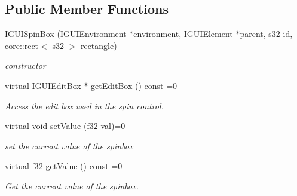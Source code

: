 \subsection*{Public Member Functions}
\begin{DoxyCompactItemize}
\item 
\mbox{\label{classirr_1_1gui_1_1IGUISpinBox_a9e9c785f73b8fadbaff330f1cbb61adf}} 
\hyperlink{classirr_1_1gui_1_1IGUISpinBox_a9e9c785f73b8fadbaff330f1cbb61adf}{I\+G\+U\+I\+Spin\+Box} (\hyperlink{classirr_1_1gui_1_1IGUIEnvironment}{I\+G\+U\+I\+Environment} $\ast$environment, \hyperlink{classirr_1_1gui_1_1IGUIElement}{I\+G\+U\+I\+Element} $\ast$parent, \hyperlink{namespaceirr_ac66849b7a6ed16e30ebede579f9b47c6}{s32} id, \hyperlink{classirr_1_1core_1_1rect}{core\+::rect}$<$ \hyperlink{namespaceirr_ac66849b7a6ed16e30ebede579f9b47c6}{s32} $>$ rectangle)
\begin{DoxyCompactList}\small\item\em constructor \end{DoxyCompactList}\item 
\mbox{\label{classirr_1_1gui_1_1IGUISpinBox_a04bd863724a7b37b97e7f9368fda77ef}} 
virtual \hyperlink{classirr_1_1gui_1_1IGUIEditBox}{I\+G\+U\+I\+Edit\+Box} $\ast$ \hyperlink{classirr_1_1gui_1_1IGUISpinBox_a04bd863724a7b37b97e7f9368fda77ef}{get\+Edit\+Box} () const =0
\begin{DoxyCompactList}\small\item\em Access the edit box used in the spin control. \end{DoxyCompactList}\item 
virtual void \hyperlink{classirr_1_1gui_1_1IGUISpinBox_a28e388e3767d4257f712d899c744bc20}{set\+Value} (\hyperlink{namespaceirr_a0277be98d67dc26ff93b1a6a1d086b07}{f32} val)=0
\begin{DoxyCompactList}\small\item\em set the current value of the spinbox \end{DoxyCompactList}\item 
\mbox{\label{classirr_1_1gui_1_1IGUISpinBox_acfb0ebe7ab30b58e9d34b7925e785bb8}} 
virtual \hyperlink{namespaceirr_a0277be98d67dc26ff93b1a6a1d086b07}{f32} \hyperlink{classirr_1_1gui_1_1IGUISpinBox_acfb0ebe7ab30b58e9d34b7925e785bb8}{get\+Value} () const =0
\begin{DoxyCompactList}\small\item\em Get the current value of the spinbox. \end{DoxyCompactList}\item 

\end{DoxyCompactItemize}
